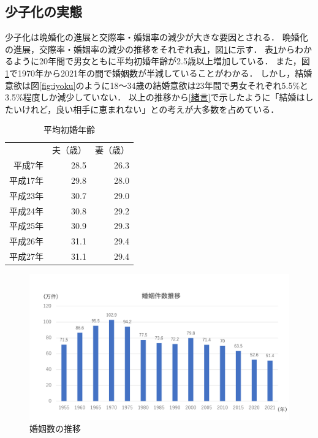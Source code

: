 \documentclass[12pt,a4j,titlepage]{ltjsarticle}
\begin{document}
\subsection{少子化の実態}
少子化は晩婚化の進展と交際率・婚姻率の減少が大きな要因とされる．
晩婚化の進展，交際率・婚姻率の減少の推移をそれぞれ表\ref{table:shokon}，図\ref{fig:konninn}に示す．
表\ref{table:shokon}からわかるように20年間で男女ともに平均初婚年齢が2.5歳以上増加している．
また，図\ref{fig:konninn}で1970年から2021年の間で婚姻数が半減していることがわかる．
しかし，結婚意欲は図\ref{fig:iyoku}のように18～34歳の結婚意欲は23年間で男女それぞれ5.5\%と3.5\%程度しか減少していない．
以上の推移から\ref{緒言}で示したように「結婚はしたいけれど，良い相手に恵まれない」との考えが大多数を占めている\cite{naikakufu2019}．
\begin{table}[h]
\centering
  \caption{平均初婚年齢}
  \label{table:shokon}
  \begin{tabular}{rrr}
   & 夫（歳） & 妻（歳） \\
  平成7年 & 28.5 & 26.3 \\
  平成17年 & 29.8 & 28.0 \\
  平成23年 & 30.7 & 29.0 \\
  平成24年 & 30.8 & 29.2 \\
  平成25年 & 30.9 & 29.3 \\
  平成26年 & 31.1 & 29.4 \\
  平成27年 & 31.1 & 29.4 \\
  \end{tabular}
  \end{table}
\begin{figure}[h]
\begin{center}
\includegraphics[keepaspectratio, scale=0.5]{koninnsuii.pdf}
\end{center}
 \caption{婚姻数の推移}
 \label{fig:konninn}
\end{figure}
\end{document}
